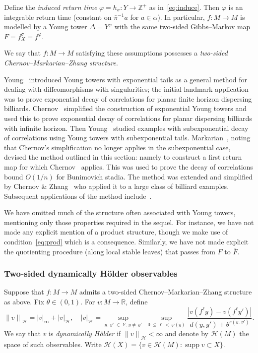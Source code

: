 \documentclass[AHL,Unicode,longabstracts,published]{cedram}
\newcommand{\R}{\mathbb{R}}
\newcommand{\Z}{\mathbb{Z}}
\newcommand{\cH}{\mathcal{H}}
\DeclareMathOperator{\supp}{supp}
\newcommand{\bF}{\bar{F}}
\begin{document}
Define the \emph{induced return time} $\varphi=h_\sigma:Y\to\Z^+$ as in~\eqref{eq:induce}. Then $\varphi$ is an integrable return time (constant on $\bar\pi^{-1}a$ for $a\in\alpha$). In particular, $f:M\to M$ is modelled by a Young tower $\Delta=Y^\varphi$ with the same two-sided Gibbs--Markov map $F=f_X^\sigma=f^\varphi$.

We say that $f:M\to M$ satisfying these assumptions possesses a \emph{two-sided Chernov--Markarian--Zhang structure}.

\begin{rema}\label{rmk:CMZ2}
Young~\cite{Young98} introduced Young towers with exponential tails as a general method for dealing with diffeomorphisms with singularities; the initial landmark application was to prove exponential decay of correlations for planar finite horizon dispersing billiards. Chernov~\cite{Chernov99} simplified the construction of exponential Young towers and used this to prove exponential decay of correlations for planar dispersing billiards with infinite horizon. Then Young~\cite{Young99} studied examples with subexponential decay of correlations using Young towers with subexponential tails. Markarian~\cite{Markarian04}, noting that Chernov's simplification no longer applies in the subexponential case, devised the method outlined in this section: namely to construct a first return map for which Chernov~\cite{Chernov99} applies. This was used to prove the decay of correlations bound $O(1/n)$ for Bunimovich stadia. The method was extended and simplified by Chernov \& Zhang~\cite{ChernovZhang05} who applied it to a large class of billiard examples. Subsequent applications of the method include~\cite{ChernovMarkarian07,ChernovZhang05b,Zhang17a}.
\end{rema}

\begin{rema}
We have omitted much of the structure often associated with Young towers, mentioning only those properties required in the sequel.
For instance, we have not made any explicit mention of a product structure, though we make use of condition~\eqref{eq:prod} which is a consequence. Similarly, we have not made explicit the quotienting procedure (along local stable leaves) that passes from $F$ to $\bF$.
\end{rema}

\subsubsection*{Two-sided dynamically H\"older observables}
Suppose that $f:M\to M$ admits a two-sided Chernov--Markarian--Zhang structure as above. Fix $\theta\in(0,1)$. For $v:M\to\R$, define
\[
{\|v\|}_\cH=|v|_\infty+{|v|}_\cH, \quad {|v|}_\cH=\sup_{y,\,y'\;\in\; Y,\,y\neq\,y'}\;\sup_{0\,\le\,\ell\,<\,\varphi(y)}
\frac{|v(f^\ell y)-v(f^\ell y')|}{d(y,y')+\theta^{s(y,\,y')}}.
\]
We say that $v$ is \emph{dynamically H\"older} if ${\|v\|}_\cH<\infty$ and denote by $\cH(M)$ the space of such observables. Write $\cH(X)=\{v\in \cH(M):\supp v\subset X\}$.
\end{document}

